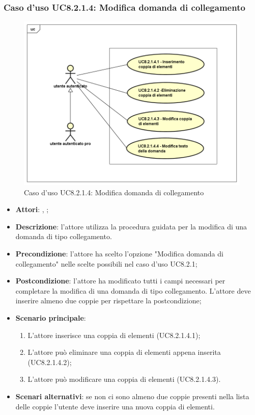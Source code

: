 \subsubsection{Caso d'uso UC8.2.1.4: Modifica domanda di collegamento}
\label{UC8.2.1.4}
\begin{figure}[h]
	\centering
	\includegraphics[scale=0.5,keepaspectratio]{UML/UC8_2_1_4.png}
	\caption{Caso d'uso UC8.2.1.4: Modifica domanda di collegamento}
\end{figure}
\FloatBarrier
\begin{itemize}
	\item \textbf{Attori}: \uau, \uaupro;
	\item \textbf{Descrizione}: l'attore utilizza la procedura guidata per la modifica di una domanda di tipo collegamento. 
	\item \textbf{Precondizione}: l'attore ha scelto l'opzione "Modifica domanda di collegamento" nelle scelte possibili nel caso d'uso UC8.2.1;
	\item \textbf{Postcondizione}: l'attore ha modificato tutti i campi necessari per completare la modifica di una domanda di tipo collegamento. L'attore deve inserire almeno due coppie per rispettare la postcondizione;
	\item \textbf{Scenario principale}: 
	\begin{enumerate}
		\item L'attore inserisce una coppia di elementi (UC8.2.1.4.1);
		\item L'attore può eliminare una coppia di elementi appena inserita (UC8.2.1.4.2);
		\item L'attore può modificare una coppia di elementi (UC8.2.1.4.3).
	\end{enumerate}
	\item \textbf{Scenari alternativi}: se non ci sono almeno due coppie presenti nella lista delle coppie l'utente deve inserire una nuova coppia di elementi.
\end{itemize}

